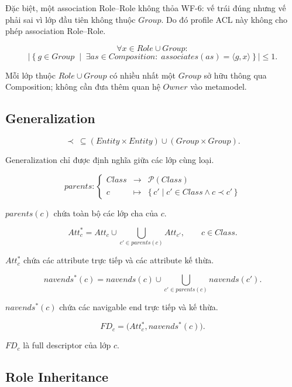 \documentclass[12pt,a4paper]{article}
\theoremstyle{definition}
\begin{document}
Đặc biệt, một association Role--Role không thỏa WF-6: vế trái đúng nhưng vế
phải sai vì lớp đầu tiên không thuộc $Group$. Do đó profile ACL này không cho
phép association Role--Role.

\[
\forall x\in Role\cup Group:
\]
\[
\left|
\left\{
g\in Group
\;\middle|\;
\exists as\in Composition:\;
associates(as)=\langle g,x\rangle
\right\}
\right|
\leq1.
\tag{WF-7}
\]

Mỗi lớp thuộc $Role\cup Group$ có nhiều nhất một $Group$ sở hữu thông qua
Composition; không cần đưa thêm quan hệ $Owner$ vào metamodel.



\subsection{Generalization}


\[
\prec\ \subseteq
(Entity\times Entity)
\cup
(Group\times Group).
\tag{WF-9}
\]

Generalization chỉ được định nghĩa giữa các lớp cùng loại.

\[
parents:
\left\{
\begin{array}{rcl}
Class & \to & \mathcal{P}(Class)\\
c & \mapsto &
\{\,c'\mid c'\in Class\land c\prec c'\,\}
\end{array}
\right.
\]

$parents(c)$ chứa toàn bộ các lớp cha của $c$.

\[
Att_c^{*}
=
Att_c
\cup
\bigcup_{c'\in parents(c)}
Att_{c'},
\qquad
c\in Class.
\]

$Att_c^{*}$ chứa các attribute trực tiếp và các attribute kế thừa.

\[
navends^{*}(c)
=
navends(c)
\cup
\bigcup_{c'\in parents(c)}
navends(c').
\]

$navends^{*}(c)$ chứa các navigable end trực tiếp và kế thừa.

\[
FD_c
=
\bigl(
Att_c^{*},
navends^{*}(c)
\bigr).
\]

$FD_c$ là full descriptor của lớp $c$.





\subsection{Role Inheritance}
\end{document}
